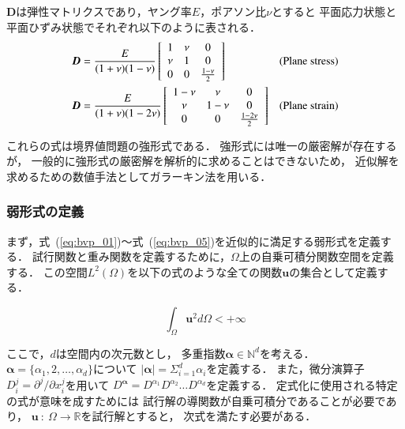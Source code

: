 \noindent
$\boldsymbol{D}$は弾性マトリクスであり，ヤング率$E$，ポアソン比$\nu$とすると
平面応力状態と平面ひずみ状態でそれぞれ以下のように表される．
\begin{align}
  \label{eq:D1}
  \boldsymbol{D} &= \frac{E}{(1+\nu)(1-\nu)} \left[
    \begin{array}{ccc}
      1 & \nu & 0 \\
      \nu & 1 & 0 \\
      0 & 0 & \frac{1-\nu}{2} 
    \end{array}
  \right] &\rm{(Plane\ stress)}\\
  \label{eq:D2}
  \boldsymbol{D}&=\frac{E}{(1+\nu)(1-2\nu)} \left[
    \begin{array}{ccc}
      1-\nu & \nu & 0 \\
      \nu & 1-\nu & 0 \\
      0 & 0 & \frac{1-2\nu}{2} 
    \end{array}
  \right] &\rm{(Plane\ strain)}
\end{align}

\noindent
これらの式は境界値問題の強形式である．
強形式には唯一の厳密解が存在するが，
一般的に強形式の厳密解を解析的に求めることはできないため，
近似解を求めるための数値手法としてガラーキン法を用いる．

\subsubsection{弱形式の定義}
まず，式~(\ref{eq:bvp_01})～式~(\ref{eq:bvp_05})を近似的に満足する弱形式を定義する．
試行関数と重み関数を定義するために，$\Omega$上の自乗可積分関数空間を定義する．
この空間$L^2(\Omega)$を以下の式のような全ての関数$\boldsymbol{u}$の集合として定義する．

\begin{equation}
  \label{L2_u2_inf}
  \int_\Omega \boldsymbol{u}^2d\Omega<+\infty
\end{equation}

ここで，$d$は空間内の次元数とし，
多重指数$\boldsymbol{\alpha}\in\mathbb{N}^d$を考える．
$\boldsymbol{\alpha}=\{\alpha_1,2,\dots,\alpha_d\}$について
$|\boldsymbol{\alpha}|=\Sigma^d_{i=1}\alpha_i$を定義する．
また，微分演算子$D^j_i=\partial^j/\partial{x^j_i}$を用いて
$D^{\boldsymbol{\alpha}}=D^{\alpha_1}D^{\alpha_2}\dots D^{\alpha_d}$を定義する．
定式化に使用される特定の式が意味を成すためには
試行解の導関数が自乗可積分であることが必要であり，
$\boldsymbol{u}\ :\ \Omega\rightarrow\mathbb{R}$を試行解とすると，
次式を満たす必要がある．

